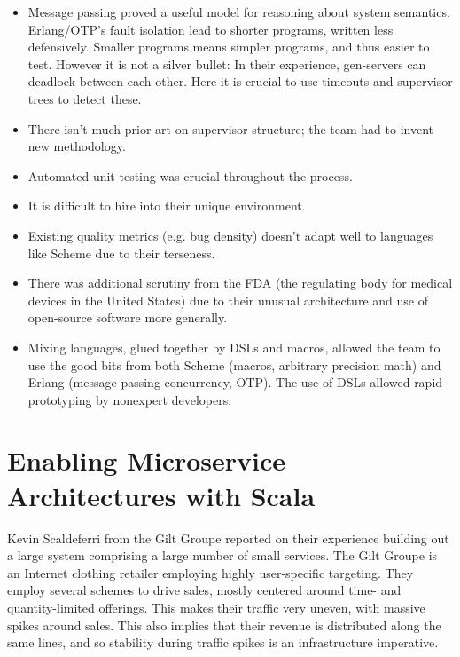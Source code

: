 \documentclass{jfp1}
\begin{document}
\begin{itemize}

\item Message passing proved a useful model for reasoning about
system semantics. Erlang/OTP's fault isolation lead to shorter
programs, written less defensively. Smaller programs means simpler
programs, and thus easier to test. However it is not a silver bullet:
In their experience, gen-servers can deadlock between each other.
Here it is crucial to use timeouts and supervisor trees to detect
these.

\item There isn't much prior art on supervisor structure; the team
had to invent new methodology.

\item Automated unit testing was crucial throughout the process.

\item It is difficult to hire into their unique environment.

\item Existing quality metrics (e.g. bug density) doesn't adapt well
to languages like Scheme due to their terseness.

\item There was additional scrutiny from the FDA (the regulating body
for medical devices in the United States) due to their unusual
architecture and use of open-source software more generally.

\item Mixing languages, glued together by DSLs and macros, allowed
the team to use the good bits from both Scheme (macros, arbitrary
precision math) and Erlang (message passing concurrency, OTP). The
use of DSLs allowed rapid prototyping by nonexpert developers.
\end{itemize}


\section{Enabling Microservice Architectures with Scala}


Kevin Scaldeferri from the Gilt Groupe reported on their experience
building out a large system comprising a large number of small
services. The Gilt Groupe is an Internet clothing retailer
employing highly user-specific targeting. They employ several schemes
to drive sales, mostly centered around time- and quantity-limited
offerings. This makes their traffic very uneven, with massive spikes
around sales. This also implies that their revenue is distributed
along the same lines, and so stability during traffic spikes is an
infrastructure imperative.
\end{document}
